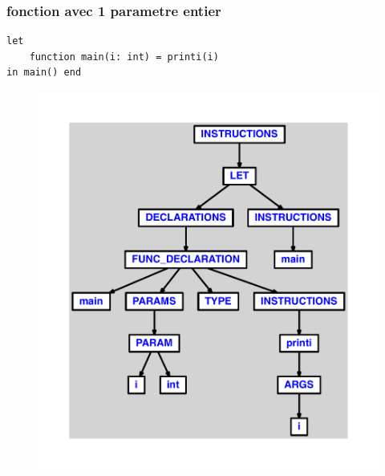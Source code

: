 \documentclass{article}
\begin{document}
\subsubsection{fonction avec 1 parametre entier}
\begin{lstlisting}
let
	function main(i: int) = printi(i)
in main() end
\end{lstlisting}
\newpage
\begin{figure}[H]
\centering
\includegraphics[max width=\textwidth]{ast/ast_233.pdf}
\end{figure}
\newpage
\end{document}
